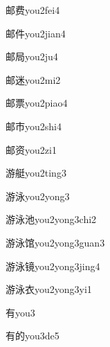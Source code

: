 \begin{verbete}[7;9]{邮费}{you2fei4}
\end{verbete}
\begin{verbete}[7;6]{邮件}{you2jian4}
\end{verbete}
\begin{verbete}[7;7]{邮局}{you2ju4}
\end{verbete}
\begin{verbete}[7;9]{邮迷}{you2mi2}
\end{verbete}
\begin{verbete}[7;11]{邮票}{you2piao4}
\end{verbete}
\begin{verbete}[7;5]{邮市}{you2shi4}
\end{verbete}
\begin{verbete}[7;10]{邮资}{you2zi1}
\end{verbete}
\begin{verbete}[12;12]{游艇}{you2ting3}
\end{verbete}
\begin{verbete}[12;8]{游泳}{you2yong3}
\end{verbete}
\begin{verbete}[12;8;6]{游泳池}{you2yong3chi2}
\end{verbete}
\begin{verbete}[12;8;11]{游泳馆}{you2yong3guan3}
\end{verbete}
\begin{verbete}[12;8;16]{游泳镜}{you2yong3jing4}
\end{verbete}
\begin{verbete}[12;8;6]{游泳衣}{you2yong3yi1}
\end{verbete}
\begin{verbete}[6]{有}{you3}
\end{verbete}
\begin{verbete}[6;8]{有的}{you3de5}
\end{verbete}

